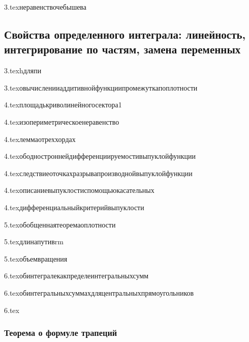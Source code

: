{3.tex}{неравенствочебышева}

\subsection{Свойства определенного интеграла: линейность, интегрирование по частям, замена переменных}

{3.tex}{hдляпи}

{3.tex}{овычисленииаддитивнойфункциипромежуткапоплотности}

{4.tex}{площадькриволинейногосектора1}

{4.tex}{изопериметрическоенеравенство}

{4.tex}{леммаотреххордах}

{4.tex}{ободностроннейдифференциируемостивыпуклойфункции}

{4.tex}{следствиеоточкахразрывапроизводнойвыпуклойфункции}

{4.tex}{описаниевыпуклостиспомощьюкасательных}

{4.tex}{дифференциальныйкритерийвыпуклости}

{5.tex}{обобщеннаятеоремаоплотности}

{5.tex}{длинапутивrm}

{5.tex}{объемвращения}

{6.tex}{обинтегралекакпределеинтегральныхсумм}

{6.tex}{обинтегральныхсуммахдляцентральныхпрямоугольников}

{6.tex}{}
\subsubsection{Теорема о формуле трапеций}

